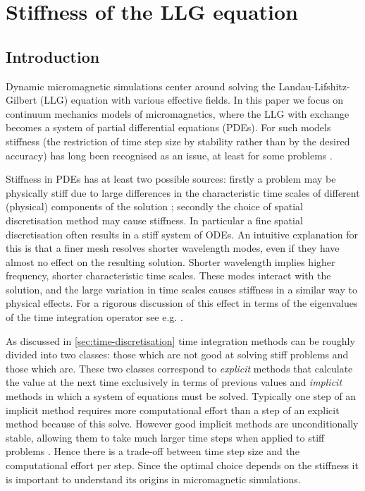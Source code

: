 
\chapter{Stiffness of the LLG equation}
\label{cha:stiffn-llg-equat}


\section{Introduction}

Dynamic micromagnetic simulations  center around solving the Landau-Lifshitz-Gilbert (LLG) equation with various effective fields.
In this paper we focus on continuum mechanics models of micromagnetics, where the LLG with exchange becomes a system of partial differential equations (PDEs).
For such models stiffness (the restriction of time step size by stability rather than by the desired accuracy) has long been recognised as an issue, at least for some problems
\cite{Nakatani1989}.

Stiffness in PDEs has at least two possible sources: 
firstly a problem may be physically stiff due to large differences in the characteristic time scales of different (physical) components of the solution \cite[Chap. 4]{Iserles2009};
secondly the choice of spatial discretisation method may cause stiffness.
In particular a fine spatial discretisation often results in a stiff system of ODEs.
An intuitive explanation for this is that a finer mesh resolves shorter wavelength modes, even if they have almost no effect on the resulting solution.
Shorter wavelength implies higher frequency, \ie shorter characteristic time scales.
These modes interact with the solution, and the large variation in time scales causes stiffness in a similar way to physical effects.
For a rigorous discussion of this effect in terms of the eigenvalues of the time integration operator see e.g. \cite[Sec 8.2]{Atkinson2009}.

As discussed in \autoref{sec:time-discretisation} time integration methods can be roughly divided into two classes: those which are not good at solving stiff problems and those which are.
These two classes correspond to \emph{explicit} methods that calculate the value at the next time exclusively in terms of previous values and \emph{implicit} methods in which a system of equations must be solved. 
Typically one step of an implicit method requires more computational effort than a step of an explicit method because of this solve.
However good implicit methods are unconditionally stable, allowing them to take much larger time steps when applied to stiff problems \cite[Chap. 4]{Iserles2009}.
Hence there is a trade-off between time step size and the computational effort per step.
Since the optimal choice depends on the stiffness it is important to understand its origins in micromagnetic simulations.

